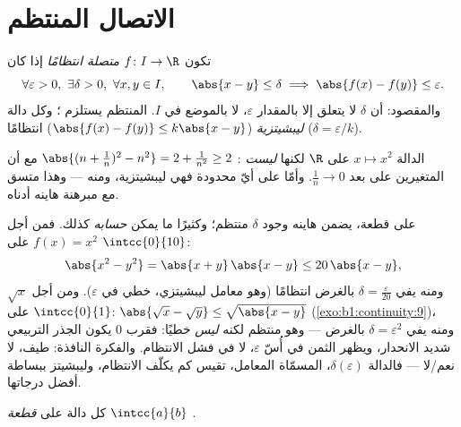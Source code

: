 \section{الاتصال المنتظم}

\begin{definition}\label{def:b1:continuity:uniform}
تكون $f \colon I \to \R$ \emph{متصلة انتظامًا} إذا كان
\[
\forall \varepsilon > 0,\ \exists \delta > 0,\ \forall x, y \in I,
\qquad \abs{x - y} \leq \delta \implies \abs{f(x) - f(y)} \leq
\varepsilon .
\]
والمقصود: أن $\delta$ لا يتعلق إلا بالمقدار $\varepsilon$، لا
بالموضع في $I$.  المنتظم يستلزم ؛ وكل دالة
\emph{ليبشيتزية} ($\abs{f(x) - f(y)} \leq k \abs{x - y}$)
 انتظامًا ($\delta = \varepsilon/k$).
\end{definition}

\begin{example}\label{ex:b1:continuity:notuniform}
الدالة $x \mapsto x^2$  على $\R$ لكنها \emph{ليست}
: $\abs{(n + \frac 1n)^2 - n^2} = 2 + \frac{1}{n^2} \geq 2$
مع أن المتغيرين على بعد $\frac 1n \to 0$. وأمّا على أيّ 
محدودة فهي ليبشيتزية، ومنه  ---
وهذا متسق مع مبرهنة هاينه أدناه.
\end{example}

\begin{example}\label{ex:b1:continuity:moduli}
على قطعة، يضمن هاينه وجود $\delta$ منتظم؛ وكثيرًا ما يمكن
\emph{حسابه} كذلك. فمن أجل $f(x) = x^2$ على $\intcc{0}{10}$:
\[
\abs{x^2 - y^2} = \abs{x + y}\,\abs{x - y} \leq 20\,\abs{x - y},
\]
ومنه يفي $\delta = \frac{\varepsilon}{20}$ بالغرض انتظامًا (وهو معامل
ليبشيتزي، خطي في $\varepsilon$). ومن أجل $\sqrt x$ على
$\intcc{0}{1}$: $\abs{\sqrt x - \sqrt y} \leq \sqrt{\abs{x -
y}}$ (\cref{exo:b1:continuity:9})، ومنه يفي $\delta = \varepsilon^2$
بالغرض --- وهو منتظم لكنه \emph{ليس} خطيًا: فقرب $0$ يكون الجذر
التربيعي شديد الانحدار، ويظهر الثمن في أُسّ
$\varepsilon$، لا في فشل الانتظام. والفكرة
النافذة:  طيف، لا نعم/لا ---
فالدالة $\delta(\varepsilon)$، المسمّاة المعامل، تقيس
كم يكلّف الانتظام، وليبشيتز ببساطة أفضل درجاتها.
\end{example}

\begin{theorem}[هاينه]\label{thm:b1:continuity:heine}
كل دالة  على \emph{قطعة} $\intcc{a}{b}$ .
\end{theorem}


